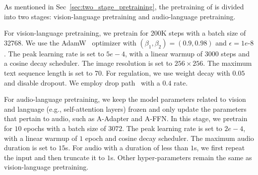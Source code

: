 



As mentioned in Sec~\ref{sec:two_stage_pretraining}, the pretraining of \onepeace is divided into two stages: vision-language pretraining and audio-language pretraining.

For vision-language pretraining, we pretrain \onepeace for 200K steps with a batch size of 32768. We use the AdamW~\cite{adamw} optimizer with $(\beta_1,\beta_2)=(0.9, 0.98)$ and $\epsilon=1e\text{-}8$. The peak learning rate is set to $5e-4$, with a linear warmup of $3000$ steps and a cosine decay scheduler. The image resolution is set to $256\times256$. The maximum text sequence length is set to 70. For regulation, we use weight decay with $0.05$ and disable dropout. We employ drop path~\cite{drop-path} with a $0.4$ rate.

For audio-language pretraining, we keep the model parameters related to vision and language (e.g., self-attention layers) frozen and only update the parameters that pertain to audio, such as A-Adapter and A-FFN.
In this stage, we pretrain \onepeace for $10$ epochs with a batch size of $3072$. The peak learning rate is set to $2e-4$, with a linear warmup of $1$ epoch and cosine decay scheduler. The maximum audio duration is set to $15$s. For audio with a duration of less than $1$s, we first repeat the input and then truncate it to $1$s.
Other hyper-parameters remain the same as vision-language pretraining.



